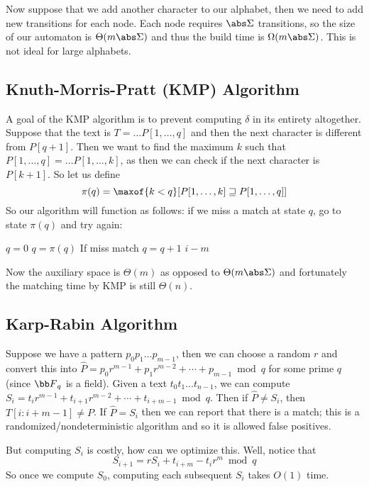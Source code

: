 \kern1cm

Now suppose that we add another character to our alphabet, then we need to add new transitions for each node.
Each node requires $\abs\Sigma$ transitions, so the size of our automaton is $\Theta(m\abs\Sigma)$ and thus the build time is $\Omega(m\abs\Sigma)$.
This is not ideal for large alphabets.

\subsection{Knuth-Morris-Pratt (KMP) Algorithm}

A goal of the KMP algorithm is to prevent computing $\delta$ in its entirety altogether.
Suppose that the text is $T=\dots P[1,\dots,q]$ and then the next character is different from $P[q+1]$.
Then we want to find the maximum $k$ such that $P[1,\dots,q]=\dots P[1,\dots,k]$, as then we can check if the next character is $P[k+1]$.
So let us define
$$ \pi(q) = \maxof{k<q}[{P[1,\dots,k]\sqsupseteq P[1,\dots,q]}] $$
So our algorithm will function as follows: if we miss a match at state $q$, go to state $\pi(q)$ and try again:

\algorithm
        \State $q=0$
             $q=\pi(q)$ \lComment If miss match
             $q=q+1$
             \Return $i-m$
        \EndFor
    \EndFunc
\ealgorithm

Now the auxiliary space is $\Theta(m)$ as opposed to $\Theta(m\abs\Sigma)$ and fortunately the matching time by KMP is still $\Theta(n)$.

\subsection{Karp-Rabin Algorithm}

Suppose we have a pattern $p_0p_1\dots p_{m-1}$, then we can choose a random $r$ and convert this into $\hat P=p_0r^{m-1}+p_1r^{m-2}+\cdots+p_{m-1}\bmod q$ for some prime $q$ (since ${\bb F}_q$ is a field).
Given a text $t_0t_1\dots t_{n-1}$, we can compute $S_i=t_ir^{m-1}+t_{i+1}r^{m-2}+\cdots+t_{i+m-1}\bmod q$.
Then if $\hat P\neq S_i$, then $T[i:i+m-1]\neq P$.
If $\hat P=S_i$ then we can report that there is a match; this is a randomized/nondeterministic algorithm and so it is allowed false positives.

But computing $S_i$ is costly, how can we optimize this.
Well, notice that
$$ S_{i+1} = rS_i + t_{i+m} - t_ir^m\bmod q $$
So once we compute $S_0$, computing each subsequent $S_i$ takes $O(1)$ time.

